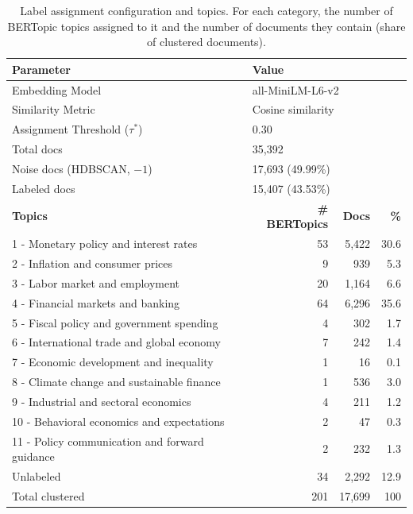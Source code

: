 \begin{appendices}
\begin{table}[h!]
    \centering
    \caption{Label assignment configuration and topics. For each category, the number of BERTopic topics assigned to it and the number of documents they contain (share of clustered documents).}
    \label{tab:label_assigner}
    \small
    \setlength{\tabcolsep}{4pt}
    \begin{tabular}{l r r r}
        \hline
        \textbf{Parameter} & \multicolumn{3}{l}{\textbf{Value}} \\
        \hline
        Embedding Model & \multicolumn{3}{l}{all-MiniLM-L6-v2} \\
        Similarity Metric & \multicolumn{3}{l}{Cosine similarity} \\
        Assignment Threshold ($\tau^*$) & \multicolumn{3}{l}{0.30} \\
        Total docs & \multicolumn{3}{l}{35,392} \\
        Noise docs (HDBSCAN, $-1$) & \multicolumn{3}{l}{17,693 (49.99\%)} \\
        Labeled docs & \multicolumn{3}{l}{15,407 (43.53\%)} \\
        \hline
        \textbf{Topics} & \textbf{\# BERTopics} & \textbf{Docs} & \textbf{\%} \\
        \hline
        1 - Monetary policy and interest rates & 53 & 5,422 & 30.6 \\
        2 - Inflation and consumer prices & 9 & 939 & 5.3 \\
        3 - Labor market and employment & 20 & 1,164 & 6.6 \\
        4 - Financial markets and banking & 64 & 6,296 & 35.6 \\
        5 - Fiscal policy and government spending & 4 & 302 & 1.7 \\
        6 - International trade and global economy & 7 & 242 & 1.4 \\
        7 - Economic development and inequality & 1 & 16 & 0.1 \\
        8 - Climate change and sustainable finance & 1 & 536 & 3.0 \\
        9 - Industrial and sectoral economics & 4 & 211 & 1.2 \\
        10 - Behavioral economics and expectations & 2 & 47 & 0.3 \\
        11 - Policy communication and forward guidance & 2 & 232 & 1.3 \\
        Unlabeled & 34 & 2,292 & 12.9 \\
        \hline
        Total clustered & 201 & 17,699 & 100 \\
        \hline
    \end{tabular}
\end{table}

\end{appendices}
\newpage


